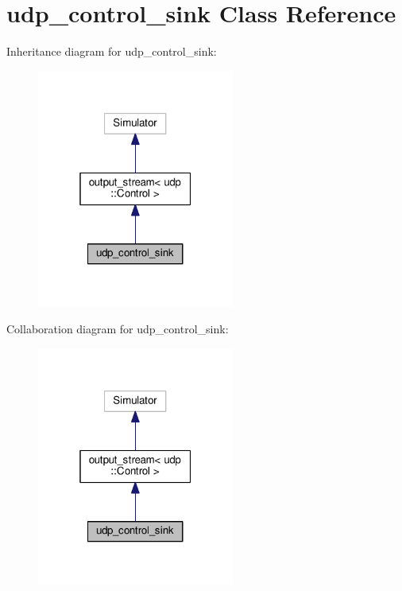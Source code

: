 \hypertarget{classudp__control__sink}{}\section{udp\+\_\+control\+\_\+sink Class Reference}
\label{classudp__control__sink}


Inheritance diagram for udp\+\_\+control\+\_\+sink\+:\nopagebreak
\begin{figure}[H]
\begin{center}
\leavevmode
\includegraphics[width=184pt]{classudp__control__sink__inherit__graph}
\end{center}
\end{figure}


Collaboration diagram for udp\+\_\+control\+\_\+sink\+:\nopagebreak
\begin{figure}[H]
\begin{center}
\leavevmode
\includegraphics[width=184pt]{classudp__control__sink__coll__graph}
\end{center}
\end{figure}

